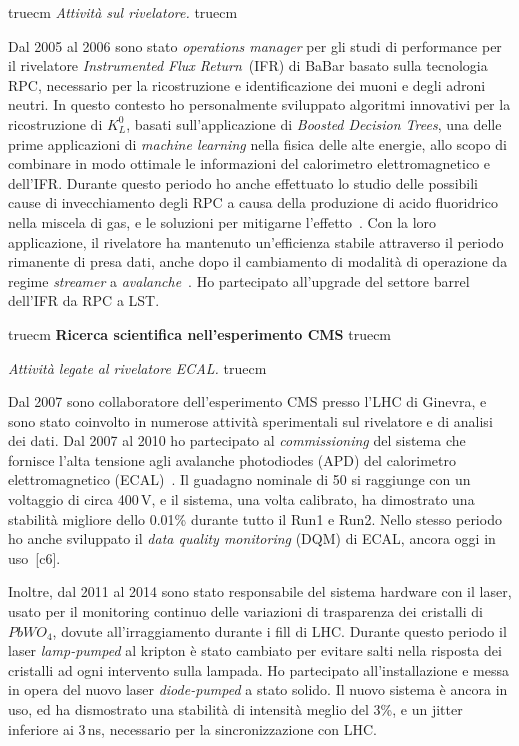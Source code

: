 \documentclass[11pt,twoside,a4paper]{article}
\begin{document}
 truecm
\textit{Attivit\`a sul rivelatore.}
 truecm

Dal 2005 al 2006 sono stato \textit{operations manager} per gli studi
di performance per il rivelatore \textit{Instrumented Flux
  Return}~(IFR) di BaBar basato sulla tecnologia RPC, necessario per
la ricostruzione e identificazione dei muoni e degli adroni neutri. In
questo contesto ho personalmente sviluppato algoritmi innovativi per
la ricostruzione di $K^0_L$, basati sull'applicazione di
\textit{Boosted Decision Trees}, una delle prime applicazioni di
\textit{machine learning} nella fisica delle alte energie, allo scopo
di combinare in modo ottimale le informazioni del calorimetro
elettromagnetico e dell'IFR. Durante questo periodo ho anche
effettuato lo studio delle possibili cause di invecchiamento degli RPC
a causa della produzione di acido fluoridrico nella miscela di gas, e
le soluzioni per mitigarne l'effetto~\cite{Band:2008zza}. Con la loro
applicazione, il rivelatore ha mantenuto un'efficienza stabile
attraverso il periodo rimanente di presa dati, anche dopo il
cambiamento di modalit\`a di operazione da regime \textit{streamer} a
\textit{avalanche}~\cite{Band:2006ig,Anulli:2005wi}. Ho partecipato
all'upgrade del settore barrel dell'IFR da RPC a LST.

\clearpage

 truecm
{\bf{Ricerca scientifica nell'esperimento CMS}}
 truecm

\textit{Attivit\`a legate al rivelatore ECAL.}
 truecm

Dal 2007 sono collaboratore dell'esperimento CMS presso l'LHC di
Ginevra, e sono stato coinvolto in numerose attivit\`a sperimentali
sul rivelatore e di analisi dei dati. Dal 2007 al 2010 ho partecipato
al \textit{commissioning} del sistema che fornisce l'alta tensione
agli avalanche photodiodes (APD) del calorimetro elettromagnetico
(ECAL)~\cite{Bartoloni_2013}. Il guadagno nominale di 50 si raggiunge
con un voltaggio di circa 400\,V, e il sistema, una volta calibrato,
ha dimostrato una stabilit\`a migliore dello 0.01\% durante tutto il
Run1 e Run2.  Nello stesso periodo ho anche sviluppato il \textit{data
  quality monitoring} (DQM) di ECAL, ancora oggi in
uso~\cite{DiMarco:2009zz}[c6].

Inoltre, dal 2011 al 2014 sono stato responsabile del sistema hardware
con il laser, usato per il monitoring continuo delle variazioni di
trasparenza dei cristalli di $PbWO_4$, dovute all'irraggiamento
durante i fill di LHC. Durante questo periodo il laser
\textit{lamp-pumped} al kripton \`e stato cambiato per evitare salti
nella risposta dei cristalli ad ogni intervento sulla lampada. Ho
partecipato all'installazione e messa in opera del nuovo laser
\textit{diode-pumped} a stato solido. Il nuovo sistema \`e ancora in
uso, ed ha dismostrato una stabilit\`a di intensit\`a meglio del 3\%,
e un jitter inferiore ai 3\,ns, necessario per la sincronizzazione con
LHC.
\end{document}
